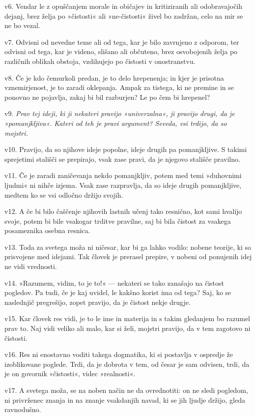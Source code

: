 v6. Vendar le z opuščanjem morale in običajev in kritiziranih ali odobravajočih dejanj, brez želja po »čistosti« ali »ne-čistosti« živel bo zadržan, celo na mir se ne bo vezal.

v7. Odvisni od nevedne teme ali od tega, kar je bilo zavrnjeno z odporom, ter odvisni od tega, kar je videno, slišano ali občuteno, brez osvobojenih želja po različnih oblikah obstoja, vzdihujejo po čistosti v onostranstvu.

v8. Če je kdo čemurkoli predan, je to delo hrepenenja; in kjer je prisotna vznemirjenost, je to zaradi oklepanja. Ampak za tistega, ki ne premine in se ponovno ne pojavlja, zakaj bi bil razburjen? Le po čem bi hrepenel?

v9. \emph{Prav tej ideji, ki ji nekateri pravijo »univerzalna«, ji pravijo drugi, da je »pomanjkljiva«.} \emph{Kateri od teh je pravi argument? Seveda, vsi trdijo, da so mojstri.}

v10. Pravijo, da so njihove ideje popolne, ideje drugih pa pomanjkljive. S takimi sprejetimi stališči se prepirajo, vsak zase pravi, da je njegovo stališče pravilno.

v11. Če je zaradi zaničevanja nekdo pomanjkljiv, potem med temi »duhovnimi ljudmi« ni nihče izjema. Vsak zase razpravlja, da so ideje drugih pomanjkljive, medtem ko se vsi odločno držijo svojih.

v12. A če bi bilo čaščenje njihovih lastnih učenj tako resnično, kot sami hvalijo svoje, potem bi bile vsakogar trditve pravilne, saj bi bila čistost za vsakega posameznika osebna resnica.

v13. Toda za svetega moža ni ničesar, kar bi ga lahko vodilo: nobene teorije, ki so prisvojene med idejami. Tak človek je prerasel prepire, v nobeni od ponujenih idej ne vidi vrednosti.

v14. »Razumem, vidim, to je to!« --- nekateri se tako zanašajo na čistost pogledov. Pa tudi, če je kaj uvidel, le kakšno korist ima od tega? Saj, ko se naslednjič pregrešijo, zopet pravijo, da je čistost nekje drugje.

v15. Kar človek res vidi, je to le ime in materija in s takim gledanjem bo razumel prav to. Naj vidi veliko ali malo, kar si želi, mojstri pravijo, da v tem zagotovo ni čistosti.

v16. Res ni enostavno voditi takega dogmatika, ki si postavlja v ospredje že izoblikovane poglede. Trdi, da je dobrota v tem, od česar je sam odvisen, trdi, da je on govornik »čistosti«, videc »realnosti«.

v17. A svetega moža, se na noben način ne da ovrednotiti: on ne sledi pogledom, ni privrženec znanja in na znanje vsakdanjih navad, ki se jih ljudje držijo, gleda ravnodušno.

